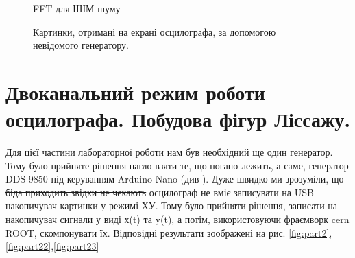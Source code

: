 \begin{figure}[h]
\begin{minipage}[h]{0.47\linewidth}
		 FFT для ШІМ шуму\\
	\end{minipage}
	\caption{Картинки, отримані на екрані осцилографа, за допомогою невідомого генератору.}
	\label{fig:part1}
\end{figure}

\section{Двоканальний режим роботи осцилографа. Побудова фігур Ліссажу.}

Для цієї частини лабораторної роботи нам був необхідний ще один генератор. Тому було прийняте рішення нагло взяти те, що погано лежить, а саме, генератор DDS 9850 під керуванням Arduino Nano (див \cite{lab3}). Дуже швидко ми зрозуміли, що \sout{біда приходить звідки не чекають} осцилограф не вміє записувати на USB накопичувач картинки у режимі ХУ. Тому було прийняти рішення, записати на накопичувач сигнали у виді х(t) та y(t), а потім, використовуючи фраємворк cern ROOT, скомпонувати їх. Відповідні результати зоображені на рис. \ref{fig:part2},\ref{fig:part22},\ref{fig:part23}


